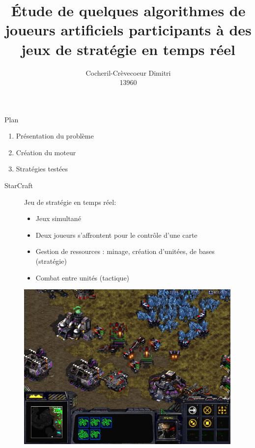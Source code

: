 \documentclass[french]{beamer}
\title{Étude de quelques algorithmes de joueurs artificiels participants à des jeux de stratégie en temps réel}
\author{Cocheril-Crèvecoeur Dimitri\\13960}
\begin{document}
\begin{frame}[plain]
    \maketitle
\end{frame}
\begin{frame}{Plan}
	\begin{enumerate}
		\item Présentation du problème
		\item Création du moteur
		\item Stratégies testées
	\end{enumerate}
\end{frame}
\begin{frame}{StarCraft}
	\begin{figure}
		\centering
		\begin{minipage}{0.5\textwidth}
			Jeu de stratégie en temps réel:
			\begin{itemize}
				\item Jeux simultané
				\item Deux joueurs s'affrontent pour le contrôle d'une carte
				\item Gestion de ressources : minage, création d'unitées, de bases (stratégie)
				\item Combat entre unités (tactique)
			\end{itemize}
		\end{minipage}\hfill
		\begin{minipage}{0.5\textwidth}
			\centering
			\includegraphics[width=0.99\textwidth]{screen_starcraft.png}
		\end{minipage}
	\end{figure}
\end{frame}
\end{document}

